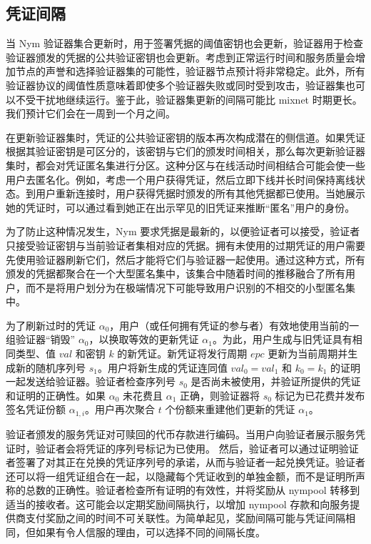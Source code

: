 \documentclass{article}
\begin{document}
	\subsection{凭证间隔}

	当 Nym 验证器集合更新时，用于签署凭据的阈值密钥也会更新，验证器用于检查验证器颁发的凭据的公共验证密钥也会更新。考虑到正常运行时间和服务质量会增加节点的声誉和选择验证器集的可能性，验证器节点预计将非常稳定。此外，所有验证器协议的阈值性质意味着即使多个验证器失败或同时受到攻击，验证器集也可以不受干扰地继续运行。鉴于此，验证器集更新的间隔可能比 mixnet 时期更长。我们预计它们会在一周到一个月之间。\newline

	在更新验证器集时，凭证的公共验证密钥的版本再次构成潜在的侧信道。如果凭证根据其验证密钥是可区分的，该密钥与它们的颁发时间相关，那么每次更新验证器集时，都会对凭证匿名集进行分区。这种分区与在线活动时间相结合可能会使一些用户去匿名化。例如，考虑一个用户获得凭证，然后立即下线并长时间保持离线状态。到用户重新连接时，用户获得凭据时颁发的所有其他凭据都已使用。当她展示她的凭证时，可以通过看到她正在出示罕见的旧凭证来推断“匿名”用户的身份。\newline

	为了防止这种情况发生，Nym 要求凭据是最新的，以便验证者可以接受，验证者只接受验证密钥与当前验证者集相对应的凭据。拥有未使用的过期凭证的用户需要先使用验证器刷新它们，然后才能将它们与验证器一起使用。通过这种方式，所有颁发的凭据都聚合在一个大型匿名集中，该集合中随着时间的推移融合了所有用户，而不是将用户划分为在极端情况下可能导致用户识别的不相交的小型匿名集中。\newline

	为了刷新过时的凭证 $\alpha_{0}$，用户（或任何拥有凭证的参与者）有效地使用当前的一组验证器“销毁” $\alpha_{0}$，以换取等效的更新凭证 $\alpha_{1}$。为此，用户生成与旧凭证具有相同类型、值 $val$ 和密钥 $k$ 的新凭证。新凭证将发行周期 $epc$ 更新为当前周期并生成新的随机序列号 $s_{1}$。用户将新生成的凭证连同值 $val_{0} = val_{1}$ 和 $k_{0} = k_{1}$ 的证明一起发送给验证器。验证者检查序列号 $s_{0}$ 是否尚未被使用，并验证所提供的凭证和证明的正确性。如果 $\alpha_{0}$ 未花费且 $\alpha_{1}$ 正确，则验证器将 $s_{0}$ 标记为已花费并发布签名凭证份额 $\alpha_{1,i}$。用户再次聚合 $t$ 个份额来重建他们更新的凭证 $\alpha_{1}$。\newline

	验证者颁发的服务凭证对可赎回的代币存款进行编码。当用户向验证者展示服务凭证时，验证者会将凭证的序列号标记为已使用。 然后，验证者可以通过证明验证者签署了对其正在兑换的凭证序列号的承诺，从而与验证者一起兑换凭证。验证者还可以将一组凭证组合在一起，以隐藏每个凭证收到的单独金额，而不是证明所声称的总数的正确性。验证者检查所有证明的有效性，并将奖励从 nympool 转移到适当的接收者。这可能会以定期奖励间隔执行，以增加 nympool 存款和向服务提供商支付奖励之间的时间不可关联性。为简单起见，奖励间隔可能与凭证间隔相同，但如果有令人信服的理由，可以选择不同的间隔长度。\newline
\end{document}
